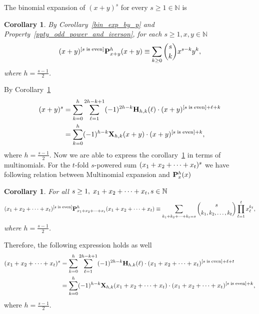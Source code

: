 \documentclass[12pt,letterpaper,oneside,reqno]{amsart}
\newcommand \multifoldSum [2][x]{{#1}\sb{1} + {#1}\sb{2} + \cdots + {#1}\sb{#2}}
\newcommand \iversonBracket [1][s]{[#1 \; \mathrm{is} \; \mathrm{even}]}
\newcommand \coeffH [4][H] {{\mathbf{#1}} \sb{#2,#3} (#4)}
\newcommand \polynomialX [4][X] {{\mathbf{#1}}\sb{#2,#3} (#4)}
\newcommand \polynomialP [4][P]{{\mathbf{#1}}\sp{#2} \sb{#3}(#4)}
\newtheorem{cor}[thm]{Corollary}
\numberwithin{equation}{section}
\begin{document}
    The binomial expansion of $(x+y)^s$ for every $s \geq 1 \in \mathbb{N}$ is
    \begin{cor}
        \label{all_power_binomial}
        By Corollary~\ref{bin_exp_by_p} and Property~\ref{ppty_odd_power_and_iverson},
        for each $s \geq 1, x, y \in \mathbb{N}$
        \begin{equation*}
            (x+y)^{\iversonBracket} \polynomialP{h}{x+y}{x+y} \equiv \sum_{k\geq0}^{} \binom{s}{k} x^{s-k} y^k,
        \end{equation*}
        where $h=\tfrac{s-1}{2}$.
    \end{cor}
    By Corollary~\ref{all_power_binomial}
    \begin{equation*}
        \begin{split}
            (x+y)^s
            &=\sum_{k=0}^{h} \sum_{\ell=1}^{2h-k+1} (-1)^{2h-k} \coeffH{h}{k}{\ell}
            \cdot (x+y)^{\iversonBracket+\ell+k} \\
            &=\sum_{k=0}^{h} (-1)^{h-k} \polynomialX{h}{k}{x+y} \cdot (x+y)^{\iversonBracket+k},
        \end{split}
    \end{equation*}
    where $h=\frac{s-1}{2}$.
    Now we are able to express the corollary~\ref{all_power_binomial} in terms of multinomials.
    For the $t$-fold $s$-powered sum $(\multifoldSum{t})^s$ we have following relation between Multinomial expansion
    and $\polynomialP{h}{x}{x}$
    \begin{cor}
        For all $s \geq 1, \; \multifoldSum{t},s \in \mathbb{N}$
        \begin{equation*}
            (\multifoldSum{t})^{\iversonBracket} \polynomialP{h}{\multifoldSum{t}}{\multifoldSum{t}}
            \equiv \sum_{\multifoldSum[k]{t}=s} \binom{s}{k_1, k_2,\ldots, k_t} \prod_{\ell=1}^{t} x_\ell^{k_\ell},
        \end{equation*}
        where $h=\frac{s-1}{2}$.
    \end{cor}
    Therefore, the following expression holds as well
    \begin{equation*}
        \begin{split}
            (\multifoldSum{t})^{s}
            &=\sum_{k=0}^{h} \sum_{\ell=1}^{2h-k+1} (-1)^{2h-k} \coeffH{h}{k}{\ell}
            \cdot (\multifoldSum{t})^{\iversonBracket+\ell+t} \\
            &=\sum_{k=0}^{h} (-1)^{h-k} \polynomialX{h}{k}{\multifoldSum{t}}
            \cdot (\multifoldSum{t})^{\iversonBracket+k},
        \end{split}
    \end{equation*}
    where $h=\frac{s-1}{2}$.
\end{document}
